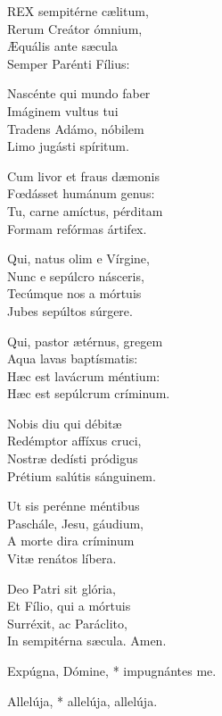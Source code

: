 
\lettrine[lines=2]{R}{EX} sempitérne cælitum,\\
Rerum Creátor ómnium,\\
Æquális ante sæcula\\
Semper Parénti Fílius:

Nascénte qui mundo faber\\
Imáginem vultus tui\\
Tradens Adámo, nóbilem\\
Limo jugásti spíritum.

Cum livor et fraus dæmonis\\
Fœdásset humánum genus:\\
Tu, carne amíctus, pérditam\\
Formam refórmas ártifex.

Qui, natus olim e Vírgine,\\
Nunc e sepúlcro násceris,\\
Tecúmque nos a mórtuis\\
Jubes sepúltos súrgere.

Qui, pastor ætérnus, gregem\\
Aqua lavas baptísmatis:\\
Hæc est lavácrum méntium:\\
Hæc est sepúlcrum críminum.

Nobis diu qui débitæ\\
Redémptor affíxus cruci,\\
Nostræ dedísti pródigus\\
Prétium salútis sánguinem.

Ut sis perénne méntibus\\
Paschále, Jesu, gáudium,\\
A morte dira críminum\\
Vitæ renátos líbera.

Deo Patri sit glória,\\
Et Fílio, qui a mórtuis\\
Surréxit, ac Paráclito,\\
In sempitérna sæcula. Amen.



 Expúgna, Dómine, * impugnántes me.


 Allelúja, * allelúja, allelúja.

